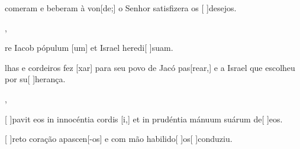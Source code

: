 {    {\item {} comeram e beberam à von[de;] o Senhor satisfizera os [ ]{de}{se}jos.~\Antiphona},
  {\item {}re Iacob pópulum [um] et Israel heredi[ ]{su}am.~\Antiphona}%
    {\item {}lhas e cordeiros fez [xar] para seu povo de Jacó pas[rear,] e a Israel que escolheu por su[ ]{he}{ran}ça.~\Antiphona},
  {\item {}[ ]{pa}vit eos in innocéntia cordis [i,] et in prudéntia mánuum suárum de[ ]{e}os.~\Antiphona}%
    {\item {}[ ]{re}to coração apascen[-os] e com mão habilido[ ]{os}[ ]{con}duziu.~\Antiphona}
}